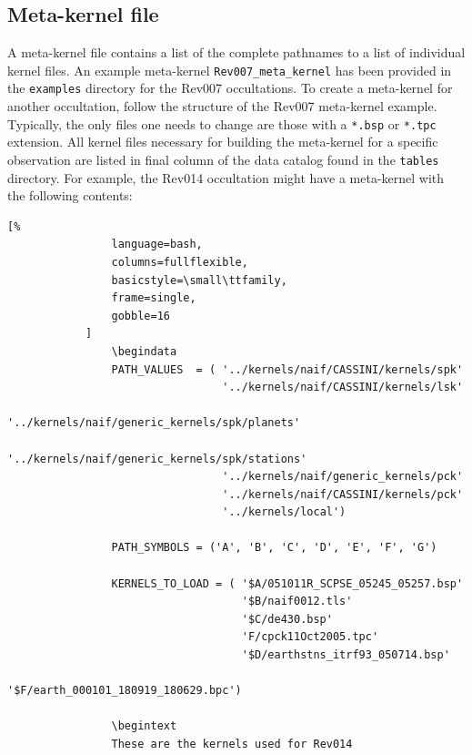 \documentclass[titlepage, 12pt]{article}
\begin{document}
    \begin{appendix}
        \section{Meta-kernel file}
            A meta-kernel file contains a list of the complete
            pathnames to a list of individual kernel files.
            An example meta-kernel \texttt{Rev007\_meta\_kernel}
            has been provided in the \texttt{examples}
            directory for the Rev007 occultations. To create
            a meta-kernel for another occultation, follow
            the structure of the Rev007 meta-kernel example.
            Typically, the only files one needs to change
            are those with a \texttt{*.bsp} or \texttt{*.tpc}
            extension. All kernel files necessary for
            building the meta-kernel for a specific observation
            are listed in final column of the data catalog
            found in the \texttt{tables} directory. For
            example, the Rev014 occultation might have
            a meta-kernel with the following contents:
            \begin{lstlisting}[%
                language=bash,
                columns=fullflexible,
                basicstyle=\small\ttfamily,
                frame=single,
                gobble=16
            ]
                \begindata
                PATH_VALUES  = ( '../kernels/naif/CASSINI/kernels/spk'
                                 '../kernels/naif/CASSINI/kernels/lsk'
                                 '../kernels/naif/generic_kernels/spk/planets'
                                 '../kernels/naif/generic_kernels/spk/stations'
                                 '../kernels/naif/generic_kernels/pck'
                                 '../kernels/naif/CASSINI/kernels/pck'
                                 '../kernels/local')

                PATH_SYMBOLS = ('A', 'B', 'C', 'D', 'E', 'F', 'G')

                KERNELS_TO_LOAD = ( '$A/051011R_SCPSE_05245_05257.bsp'
                                    '$B/naif0012.tls'
                                    '$C/de430.bsp'
                                    'F/cpck11Oct2005.tpc'
                                    '$D/earthstns_itrf93_050714.bsp'
                                    '$F/earth_000101_180919_180629.bpc')

                \begintext
                These are the kernels used for Rev014
            \end{lstlisting}

\end{appendix}
\end{document}
